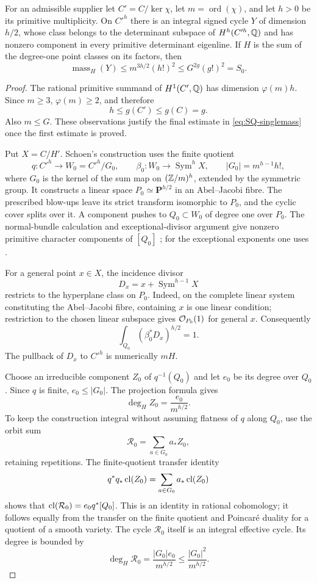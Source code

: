 \begin{proposition}\label{SQ4}
For an admissible supplier let $C'=C/\ker\chi$, let $m=\operatorname{ord}(\chi)$, and let $h>0$ be its primitive multiplicity. On $C'^h$ there is an integral signed cycle $Y$ of dimension $h/2$, whose class belongs to the determinant subspace of $H^h(C'^h,\mathbb Q)$ and has nonzero component in every primitive determinant eigenline. If $H$ is the sum of the degree-one point classes on its factors, then
\begin{equation}\label{eq:SQ-singlemass}
 \operatorname{mass}_H(Y)\le m^{3h/2}(h!)^2
                  \le G^{2g}(g!)^2=S_0.
\end{equation}
\end{proposition}
\begin{proof}
The rational primitive summand of $H^1(C',\mathbb Q)$ has dimension $\varphi(m)h$. Since $m\ge3$, $\varphi(m)\ge2$, and therefore
\[
 h\le g(C')\le g(C)=g.
\]
Also $m\le G$. These observations justify the final estimate in \eqref{eq:SQ-singlemass} once the first estimate is proved.

Put $X=C/H'$. Schoen's construction uses the finite quotient
\[
 q:C'^h\longrightarrow W_0=C'^h/G_0,
 \qquad \beta_0:W_0\longrightarrow\operatorname{Sym}^hX,
 \qquad |G_0|=m^{h-1}h!,
\]
where $G_0$ is the kernel of the sum map on $(\mathbb Z/m)^h$, extended by the symmetric group. It constructs a linear space $P_0\simeq\mathbf P^{h/2}$ in an Abel--Jacobi fibre. The prescribed blow-ups leave its strict transform isomorphic to $P_0$, and the cyclic cover splits over it. A component pushes to $Q_0\subset W_0$ of degree one over $P_0$. The normal-bundle calculation and exceptional-divisor argument give nonzero primitive character components of $[Q_0]$ \citep[Theorem~2.0, Lemmas~2.3--2.6, pp.~11--17]{Schoen88}; for the exceptional exponents one uses \citet[Section~4, Lemma \texttt{lem:schoenR}]{Severn26}.

For a general point $x\in X$, the incidence divisor
\[
 D_x=x+\operatorname{Sym}^{h-1}X
\]
restricts to the hyperplane class on $P_0$. Indeed, on the complete linear system constituting the Abel--Jacobi fibre, containing $x$ is one linear condition; restriction to the chosen linear subspace gives $\mathcal O_{P_0}(1)$ for general $x$. Consequently
\[
 \int_{Q_0}(\beta_0^*D_x)^{h/2}=1.
\]
The pullback of $D_x$ to $C'^h$ is numerically $mH$.

Choose an irreducible component $Z_0$ of $q^{-1}(Q_0)$ and let $e_0$ be its degree over $Q_0$. Since $q$ is finite, $e_0\le|G_0|$. The projection formula gives
\[
 \deg_H Z_0=\frac{e_0}{m^{h/2}}.
\]
To keep the construction integral without assuming flatness of $q$ along $Q_0$, use the orbit sum
\[
 \mathcal R_0=\sum_{a\in G_0}a_*Z_0,
\]
retaining repetitions. The finite-quotient transfer identity
\[
 q^*q_*\operatorname{cl}(Z_0)=\sum_{a\in G_0}a_*\operatorname{cl}(Z_0)
\]
shows that $\operatorname{cl}(\mathcal R_0)=e_0q^*[Q_0]$. This is an identity in rational cohomology; it follows equally from the transfer on the finite quotient and Poincar\'e duality for a quotient of a smooth variety. The cycle $\mathcal R_0$ itself is an integral effective cycle. Its degree is bounded by
\[
 \deg_H\mathcal R_0
  =\frac{|G_0|e_0}{m^{h/2}}
  \le\frac{|G_0|^2}{m^{h/2}}.
\]


\end{proof}
